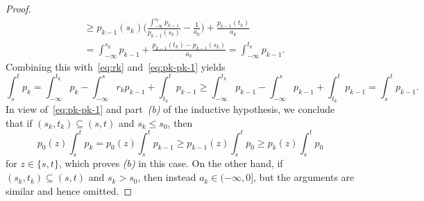 \documentclass[a4paper]{article}
\theoremstyle{definition}
\begin{document}
\begin{proof}
\begin{align*}
&\geq p_{k-1}(s_k)\biggl(\frac{\int_{-\infty}^{s_k} p_{k-1}}{p_{k-1}(s_k)} - \frac{1}{a_k}\biggr) + \frac{p_{k-1}(t_k)}{a_k} \\
&= \int_{-\infty}^{s_k} p_{k-1} + \frac{p_{k-1}(t_k) - p_{k-1}(s_k)}{a_k} = \int_{-\infty}^{t_k} p_{k-1}.
\end{align*}
Combining this with~\eqref{eq:rk} and~\eqref{eq:pk-pk-1} yields
\[
\int_s^t p_k = \int_{-\infty}^{t_k}p_k - \int_{-\infty}^s r_k p_{k-1} + \int_{t_k}^t p_{k-1} \geq \int_{-\infty}^{t_k}p_{k-1} - \int_{-\infty}^s p_{k-1} + \int_{t_k}^t p_{k-1} = \int_s^t p_{k-1}.
\]
In view of~\eqref{eq:pk-pk-1} and part~\textit{(b)} of the inductive hypothesis, we conclude that if $(s_k,t_k) \subseteq (s,t)$ and $s_k \leq s_0$, then
\[
p_0(z) \int_s^t p_k  = p_0(z) \int_s^t p_{k-1} \geq p_{k-1}(z) \int_s^t p_0 \geq p_k(z) \int_s^t p_0
\]
for $z \in \{s,t\}$, which proves \textit{(b)} in this case. On the other hand, if $(s_k,t_k) \subseteq (s,t)$ and $s_k > s_0$, then instead $a_k \in (-\infty,0]$, but the arguments are similar and hence omitted.


\end{proof}
\end{document}
